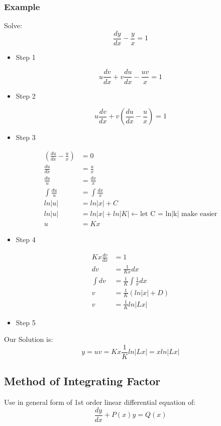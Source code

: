 \documentclass[12pt,a4paper]{article}
\begin{document}
	\subsubsection{Example}
	Solve:
	\[
	\frac{dy}{dx} - \frac{y}{x}= 1
	\]
	\begin{itemize}
		\item Step 1
	\end{itemize}
	\[
	u\frac{dv}{dx} + v \frac{du}{dx} - \frac{uv}{x}= 1
	\]
	\begin{itemize}
		\item Step 2
	\end{itemize}
	\[
	u\frac{dv}{dx} + v( \frac{du}{dx} - \frac{u}{x})= 1
	\]
	\begin{itemize}
		\item Step 3
	\end{itemize}
	\[
	\begin{split}
		( \frac{du}{dx} - \frac{u}{x}) &= 0  \\
		\frac{du}{dx} &= \frac{u}{x} \\
		\frac{du}{u} &= \frac{dx}{x} \\
		\int \frac{du}{u} &= \int \frac{dx}{x} \\
		ln|u| &= ln|x| + C \\
		ln|u| &= ln|x| + ln|K| \leftarrow \text{let C = ln|k| make easier} \\
		u &= Kx
	\end{split}
	\]
	\begin{itemize}
		\item Step 4
	\end{itemize}
	\[
	\begin{split}
		Kx\frac{dv}{dx} &= 1 \\
		dv &= \frac{1}{Kx} dx \\
		\int dv &= \frac{1}{K}\int \frac{1}{x} dx \\
		v &= \frac{1}{K} (ln|x| + D) \\
		v &= \frac{1}{K} ln|Lx|
	\end{split}
	\]
	\begin{itemize}
		\item Step 5
	\end{itemize}
	Our Solution is:
	\[
	y = uv = Kx\frac{1}{K} ln|Lx| = xln|Lx|
	\]
	

	\subsection{Method of Integrating Factor}
	Use in general form of 1st order linear differential equation of:
	\[
	\frac{dy}{dx} + P(x)y = Q(x)
	\]
\end{document}
